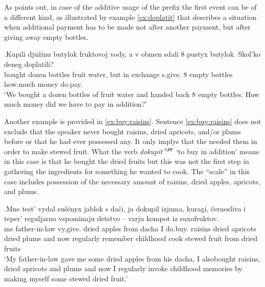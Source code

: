 As \citet[80]{Kagan:book} points out, in case of the additive usage of the prefix  the first event can be of a different kind, as illustrated by example \ref{ex:doplatit} that describes a situation when additional payment has to be made not after another payment, but after giving away empty bottles.

\exg.\label{ex:doplatit}Kupili dju\v{z}inu butylok fruktovoj vody, a v obmen sdali 8 pustyx butylok. Skol'ko deneg doplatili?\\
bought dozen bottles fruit water, but in exchange s.give. 8 empty bottles how.much money do.pay.\\
\trans `We bought a dozen bottles of fruit water and handed back 8 empty bottles. How much money did we have to pay in addition?'


Another example is provided in \ref{ex:buy:raisins}. Sentence \ref{ex:buy:raisins} does not exclude that the speaker never bought raisins, dried apricots, and/or plums before or that he had ever possessed any. It only implys that the needed them in order to make stewed fruit. What the verb \textit{dokupit'}$^{\PF}$ `to buy in addition' means in this case is that he bought the dried fruits but this was not the first step in gathering the ingredients for something he wanted to cook. The ``scale'' in this case includes possession of the necessary amount of raisins, dried apples, apricots, and plums. 

\exg.\label{ex:buy:raisins}Mne test' vydal su\v{s}\"{e}nyx jablok s da\v{c}i, ja dokupil izjuma, kuragi, \v{c}ernosliva i teper' reguljarno vspominaju detstvo -- varju kompot iz suxofruktov.\\
me father-in-law vy.give. dried apples from dacha I do.buy. raisins {dried apricots} {dried plums} and now regularly remember childhood {} cook {stewed fruit} from {dried fruits}\\
\trans `My father-in-law gave me some dried apples from his dacha, I also\linebreak bought raisins, dried apricots and plums and now I regularly invoke childhood memories by making myself some stewed dried fruit.'\\

